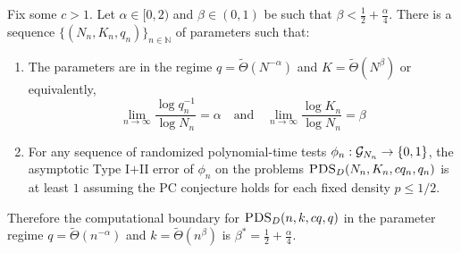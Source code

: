 \documentclass[11pt]{article}
\begin{document}
\begin{theorem}
Fix some $c > 1$. Let $\alpha \in [0, 2)$ and $\beta \in (0, 1)$ be such that $\beta < \frac{1}{2} + \frac{\alpha}{4}$. There is a sequence $\{ (N_n, K_n, q_n) \}_{n \in \mathbb{N}}$ of parameters such that:
\begin{enumerate}
\item The parameters are in the regime $q = \tilde{\Theta}(N^{-\alpha})$ and $K = \tilde{\Theta}(N^\beta)$ or equivalently,
$$\lim_{n \to \infty} \frac{\log q_n^{-1}}{\log N_n} = \alpha \quad \text{and} \quad \lim_{n \to \infty} \frac{\log K_n}{\log N_n} = \beta$$
\item For any sequence of randomized polynomial-time tests $\phi_n : \mathcal{G}_{N_n} \to \{0, 1\}$, the asymptotic Type I$+$II error of $\phi_n$ on the problems $\textsc{PDS}_D(N_n, K_n, cq_n, q_n)$ is at least $1$ assuming the PC conjecture holds for each fixed density $p \le 1/2$.
\end{enumerate}
Therefore the computational boundary for $\textsc{PDS}_D(n, k, cq, q)$ in the parameter regime $q = \tilde{\Theta}(n^{-\alpha})$ and $k = \tilde{\Theta}(n^\beta)$ is $\beta^* = \frac{1}{2} + \frac{\alpha}{4}$.
\end{theorem}
\end{document}

